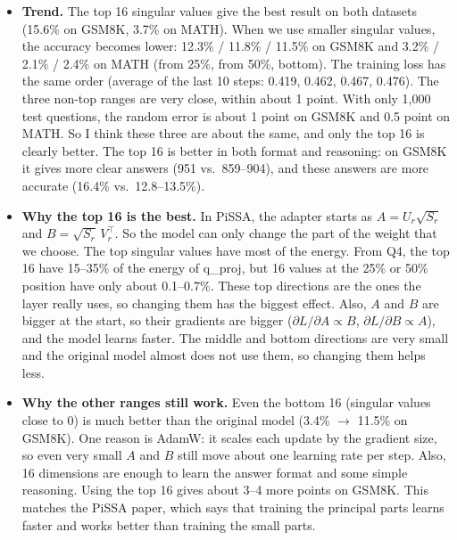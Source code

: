 \documentclass[10pt,a4paper]{article}
\begin{document}
\begin{itemize}
  \item \textbf{Trend.} The top 16 singular values give the best result on both datasets (15.6\% on GSM8K, 3.7\%
  on MATH). When we use smaller singular values, the accuracy becomes lower: 12.3\% / 11.8\% / 11.5\% on GSM8K and
  3.2\% / 2.1\% / 2.4\% on MATH (from 25\%, from 50\%, bottom). The training loss has the same order (average of
  the last 10 steps: 0.419, 0.462, 0.467, 0.476). The three non-top ranges are very close, within about 1 point.
  With only 1,000 test questions, the random error is about 1 point on GSM8K and 0.5 point on MATH. So I think
  these three are about the same, and only the top 16 is clearly better. The top 16 is better in both format and
  reasoning: on GSM8K it gives more clear answers (951 vs.\ 859--904), and these answers are more accurate
  (16.4\% vs.\ 12.8--13.5\%).
  \item \textbf{Why the top 16 is the best.} In PiSSA, the adapter starts as $A = U_r\sqrt{S_r}$ and
  $B = \sqrt{S_r}\,V_r^{\top}$. So the model can only change the part of the weight that we choose. The top
  singular values have most of the energy. From Q4, the top 16 have 15--35\% of the energy of q\_proj, but 16
  values at the 25\% or 50\% position have only about 0.1--0.7\%. These top directions are the ones the layer
  really uses, so changing them has the biggest effect. Also, $A$ and $B$ are bigger at the start, so their
  gradients are bigger ($\partial L/\partial A \propto B$, $\partial L/\partial B \propto A$), and the model learns
  faster. The middle and bottom directions are very small and the original model almost does not use them, so
  changing them helps less.
  \item \textbf{Why the other ranges still work.} Even the bottom 16 (singular values close to 0) is much better
  than the original model (3.4\% $\to$ 11.5\% on GSM8K). One reason is AdamW: it scales each update by the gradient
  size, so even very small $A$ and $B$ still move about one learning rate per step. Also, 16 dimensions are enough to
  learn the answer format and some simple reasoning. Using the top 16 gives about 3--4 more points on GSM8K. This
  matches the PiSSA paper, which says that training the principal parts learns faster and works better than training
  the small parts.
\end{itemize}

\end{document}
